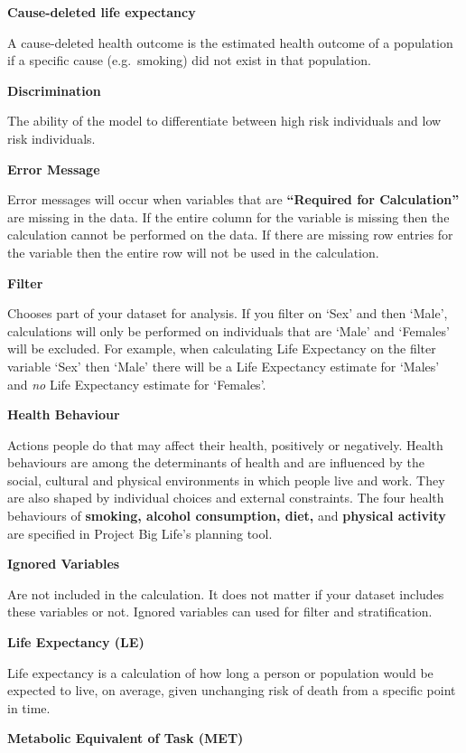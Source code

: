 \documentclass[]{book}
\begin{document}
\textbf{Cause-deleted life expectancy}

A cause-deleted health outcome is the estimated
health outcome of a population if a specific cause (e.g.~smoking) did
not exist in that population.

\textbf{Discrimination}

The ability of the model to differentiate between high risk individuals
and low risk individuals.

\textbf{Error Message}

Error messages will occur when variables that are
\textbf{``Required for Calculation''} are missing in the data. If the
entire column for the variable is missing then the calculation cannot be
performed on the data. If there are missing row entries for the variable
then the entire row will not be used in the calculation.

\textbf{Filter}

Chooses part of your dataset for analysis. If you filter on
`Sex' and then `Male', calculations will only be performed on
individuals that are `Male' and `Females' will be excluded. For example,
when calculating Life Expectancy on the filter variable `Sex' then
`Male' there will be a Life Expectancy estimate for `Males' and
\emph{no} Life Expectancy estimate for `Females'.

\textbf{Health Behaviour}

Actions people do that may affect their health, positively or
negatively. Health behaviours are among the determinants of health and
are influenced by the social, cultural and physical environments in
which people live and work.\citep{StatsCan2010} They are also shaped by
individual choices and external constraints.\citep{StatsCan2010} The
four health behaviours of \textbf{smoking, alcohol consumption, diet,}
and \textbf{physical activity} are specified in Project Big Life's
planning tool.

\textbf{Ignored Variables}

Are not included in the calculation. It does not matter if your dataset
includes these variables or not. Ignored variables can used for filter
and stratification.

\textbf{Life Expectancy (LE)}

Life expectancy is a calculation of how long a person or
population would be expected to live, on average, given unchanging risk
of death from a specific point in time.

\textbf{Metabolic Equivalent of Task (MET)}
\end{document}
